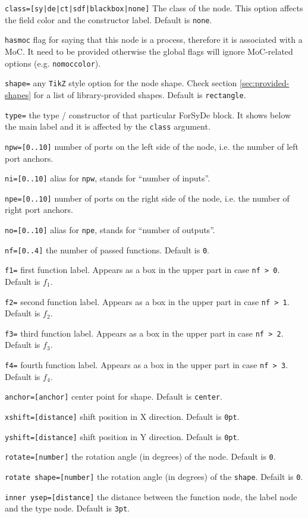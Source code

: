 \begin{optionslist}
\item \texttt{class=[sy|de|ct|sdf|blackbox|none]} The class of the node. This option affects the field color and the constructor label. Default is \texttt{none}.
\item \texttt{hasmoc} flag for saying that this node is a process, therefore it is associated with a MoC. It need to be provided otherwise the global flags will ignore MoC-related options (e.g. \texttt{nomoccolor}).
\item \texttt{shape=} any \texttt{TikZ} style option for the node shape. Check section \ref{sec:provided-shapes} for a list of library-provided shapes. Default is \texttt{rectangle}.
\item \texttt{type=} the type / constructor of that particular ForSyDe block. It shows below the main label and it is affected by the \texttt{class} argument.
\item \texttt{npw=[0..10]} number of ports on the left side of the node, i.e. the number of left port anchors.
\item \texttt{ni=[0..10]} alias for \texttt{npw}, stands for ``number of inputs''.
\item \texttt{npe=[0..10]} number of ports on the right side of the node, i.e. the number of right port anchors.
\item \texttt{no=[0..10]} alias for \texttt{npe}, stands for ``number of outputs''.
\item \texttt{nf=[0..4]} the number of passed functions. Default is \texttt{0}.
\item \texttt{f1=} first function label. Appears as a box in the upper part in case \texttt{nf > 0}. Default is $f_1$.
\item \texttt{f2=} second function label. Appears as a box in the upper part in case \texttt{nf > 1}. Default is $f_2$.
\item \texttt{f3=} third function label. Appears as a box in the upper part in case \texttt{nf > 2}. Default is $f_3$.
\item \texttt{f4=} fourth function label. Appears as a box in the upper part in case \texttt{nf > 3}. Default is $f_4$.
\item \texttt{anchor=[anchor]} center point for shape. Default is \texttt{center}.
\item \texttt{xshift=[distance]} shift position in X direction. Default is \texttt{0pt}.
\item \texttt{yshift=[distance]} shift position in Y direction. Default is \texttt{0pt}.
\item \texttt{rotate=[number]} the rotation angle (in degrees) of the node. Default is \texttt{0}.
\item \texttt{rotate shape=[number]} the rotation angle (in degrees) of the \texttt{shape}. Defailt is \texttt{0}.
\item \texttt{inner ysep=[distance]} the distance between the function node, the label node and the type node. Default is \texttt{3pt}.
\end{optionslist}

